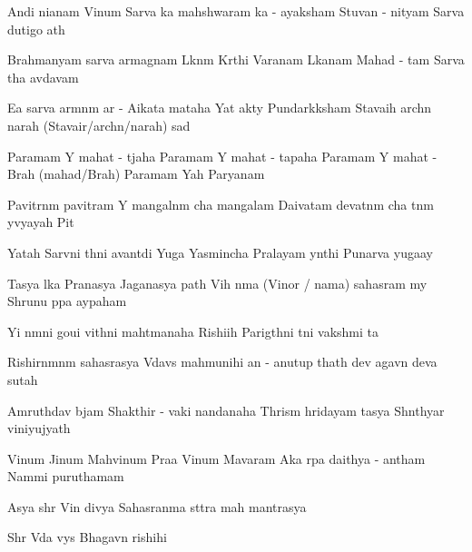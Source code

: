 \documentclass[20pt]{article}
\begin{document}
\SlokaHuge
{An{\aaa}di ni{\dH}anam Vi{\sh}num} {Sarva {\lo}ka mah{\e}shwaram}
{{\Lo}ka - a{\dH}yaksham Stuvan - nityam} {Sarva du{\kh}{\A}tigo {\bh}a{\ve}th}

\SlokaHuge
{Brahmanyam sarva {\Dh}armagnam} {L{\oh}k{\A}n{\A}m K{\ee}rthi Var{\dH}anam}
{L{\oh}kan{\A}{\tH}am Mahad - {\bh}{\oo}tam} {Sarva {\Bh}{\oo}tha {\bh}av{\oh}d{\bh}avam}

\SlokaHuge
{E{\sh}a {\me} sarva {\Dh}arm{\A}n{\A}m} {{\Dh}ar{\mo} - A{\dH}ikata{\mo} mataha}
{Yat \dsh {\bh}akty{\A} Pundar{\ee}k{\A}ksham} {Stavaih arch{\e}n narah (Stavair/arch{\e}n/narah) sad{\A}}

\novspace
\SlokaHuge
{Paramam Y{\oh} mahat - t{\e}jaha} {Paramam Y{\oh} mahat - tapaha}
{Paramam Y{\oh} mahat - Brah{\ma} (mahad/Brah{\ma})} {Paramam Yah Par{\A}yanam}

\SlokaHuge
{Pavitr{\A}n{\A}m pavitram Y{\oh}} {mangal{\A}n{\A}m cha mangalam}
{Daivatam devat{\A}n{\A}m cha} {{\Bh}{\oo}t{\A}n{\A}m y{\oh}vyayah Pit{\A}}

\SlokaHuge
{Yatah Sarv{\A}ni {\Bh}{\oo}th{\A}ni} {{\Bh}avant{\ya}di Yu{\ga}ga{\me}}
{Yasmin{\sh}cha Pralayam y{\A}nthi} {Punar{\e}va yuga{\ksh}ay{\e}}

\SlokaHuge
{Tasya l{\oh}ka Pra{\dH}{\A}nasya} {Jagan{\na}{\tH}asya {\Bh}{\oo}path{\e}}
{Vi{\sh}{\no}h \dsh n{\A}ma (Vi{\sh}nor / nama) sahasram m{\e}y} {Shrunu p{\A}pa {\bh}ay{\A}paham}

\novspace
\SlokaHuge
{Y{\an}i n{\A}m{\A}ni goui} {vi{\kh}{\ya}th{\A}ni mah{\A}tmanaha}
{Rishi{\bh}ih Parig{\ee}th{\A}ni} {t{\ha}ni vaksh{\ya}mi {\Bh}{\oo}ta{\ye}}

\SlokaHuge
{Rishirn{\A}mn{\A}m sahasrasya} {V{\e}dav{\ya}s{\oh} mah{\A}munihi}
{{\Ch}an{\dO} - anu{\sh}tup thath{\A} dev{\oh}} {{\Bh}agav{\A}n deva{\ki} sutah}

\SlokaHuge
{Amruth{\am}{\sh}{\oo}d{\bh}av{\oh} b{\ee}jam} {Shakthir - {\De}vaki nandanaha}
{Thris{\A}m{\A} hridayam tasya} {Sh{\aaa}nthyar{\tHe} viniyujyath{\e}}

\SlokaHuge
{Vi{\sh}num Ji{\sh}num Mah{\A}vi{\sh}num} {Pra{\bh}a Vi{\sh}num Ma{\he}{\sh}varam}
{A{\nE}ka r{\oo}pa daithya - antham} {Nam{\A}mi puru{\sho}thamam}

\resetcountr
\newpage
{}

\SlokaHuge
{Asya shr{\ee} Vi{\sh}n{\oh} divya}
{Sahasran{\aaa}ma st{\oh}tra mah{\A} mantrasya}

\SlokaHuge
{Shr{\ee} V{\e}da vy{\A}s{\oh} Bhagav{\A}n rishihi}
\end{document}
